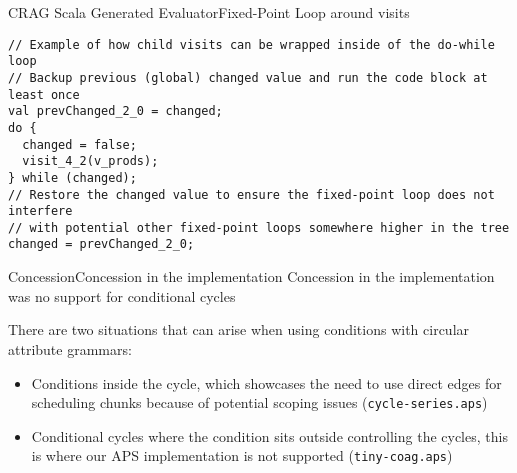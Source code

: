 \begin{frame}[fragile=singleslide]{CRAG Scala Generated Evaluator}{Fixed-Point Loop around visits}
\begin{Verbatim}[fontsize=\scriptsize]
// Example of how child visits can be wrapped inside of the do-while loop
// Backup previous (global) changed value and run the code block at least once
val prevChanged_2_0 = changed;
do {
  changed = false;
  visit_4_2(v_prods);
} while (changed);
// Restore the changed value to ensure the fixed-point loop does not interfere
// with potential other fixed-point loops somewhere higher in the tree
changed = prevChanged_2_0;
\end{Verbatim}
\end{frame}


\begin{frame}{Concession}{Concession in the implementation}
    \alert{Concession} in the implementation was \alert{no support for conditional cycles}

    \newlinevspace 
    There are two situations that can arise when using conditions with circular attribute grammars:
    
    \begin{itemize}
        \item[] \cmark \; \alert{Conditions inside the cycle}, which showcases the need to use direct edges for scheduling chunks because of potential scoping issues (\texttt{cycle-series.aps})
        \item[] \xmark \; Conditional cycles where the \alert{condition sits outside controlling the cycles}, this is where our APS implementation is not supported (\texttt{tiny-coag.aps})
    \end{itemize}
\end{frame}

